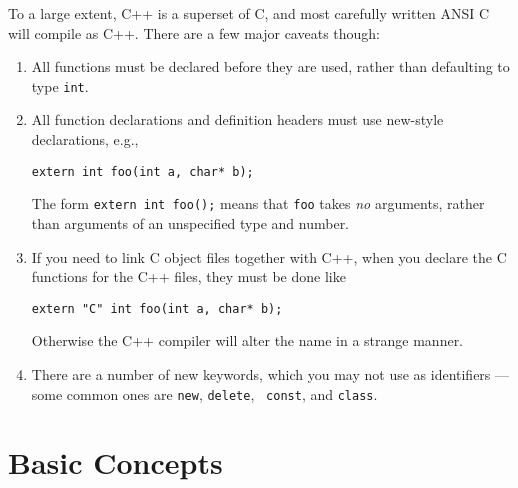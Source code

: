 To a large extent, C++ is a superset of C, and most carefully written
ANSI C will compile as C++.  There are a few major caveats though:
\begin{enumerate}
\item All functions must be declared before they are used, rather than
defaulting to type {\tt int}.
\item All function declarations and definition headers must use
new-style declarations, e.g.,
\begin{verbatim}
extern int foo(int a, char* b);
\end{verbatim}
The form {\tt extern int foo();} means that {\tt foo} takes {\it no}
arguments, rather than arguments of an unspecified type and number.
\item If you need to link C object files together with C++, when you
declare the C functions for the C++ files, they must be done like
\begin{verbatim}
extern "C" int foo(int a, char* b);
\end{verbatim}
Otherwise the C++ compiler will
alter the name in a strange manner.
\item There are a number of new keywords, which you may not use as
identifiers --- some common ones are {\tt new}, {\tt delete}, {\tt
const}, and {\tt class}.
\end{enumerate}

\section{Basic Concepts}

